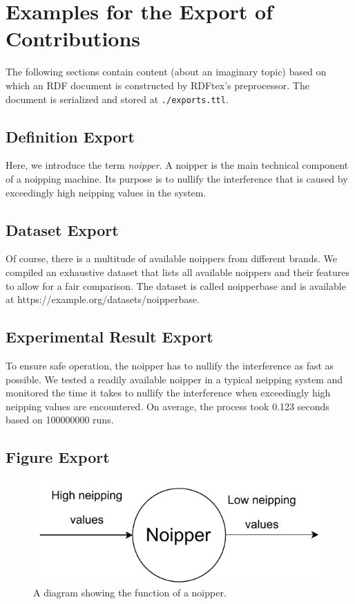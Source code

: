 
\section{Examples for the Export of Contributions}

The following sections contain content (about an imaginary topic) based on which an RDF document is constructed by RDFtex's preprocessor. The document is serialized and stored at \texttt{./exports.ttl}.

\subsection{Definition Export}

Here, we introduce the term \emph{noipper}. A noipper is the main technical component of a noipping machine. Its purpose is to nullify the interference that is caused by exceedingly high neipping values in the system.

\subsection{Dataset Export}

Of course, there is a multitude of available noippers from different brands. We compiled an exhaustive dataset that lists all available noippers and their features to allow for a fair comparison. The dataset is called noipperbase and is available at https://example.org/datasets/noipperbase.

\subsection{Experimental Result Export}

To ensure safe operation, the noipper has to nullify the interference as fast as possible. We tested a readily available noipper in a typical neipping system and monitored the time it takes to nullify the interference when exceedingly high neipping values are encountered. On average, the process took 0.123 seconds based on 100000000 runs.  

\subsection{Figure Export}

\begin{figure}[htb!]
    \centering
    \includegraphics[width=0.8\columnwidth]{./figures/noipper_function}
    \caption{A diagram showing the function of a noipper.}
    \label{fig:scikg-structure}
\end{figure}

